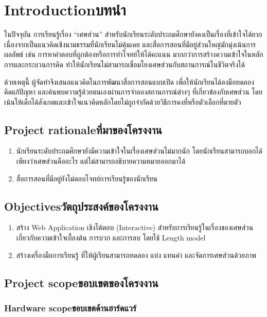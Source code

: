 \chapter{\ifenglish Introduction\else บทนำ\fi}
ในปัจจุบัน การเรียนรู้เรื่อง “เศษส่วน” สำหรับนักเรียนระดับประถมศึกษายังคงเป็นเรื่องที่เข้าใจได้ยาก เนื่องจากเป็นแนวคิดเชิงนามธรรมที่นักเรียนไม่คุ้นเคย และสื่อการสอนที่มีอยู่ส่วนใหญ่มักมุ่งเน้นการผลลัพธ์ เช่น การหาคำตอบที่ถูกต้องหรือการทำโจทย์ให้ได้คะแนน มากกว่าการสร้างความเข้าใจในหลักการและกระบวนการคิด ทำให้นักเรียนไม่สามารถเชื่อมโยงเศษส่วนกับสถานการณ์ในชีวิตจริงได้

ด้วยเหตุนี้ ผู้จัดทำจึงเสนอแนวคิดในการพัฒนาสื่อการสอนแบบเปิด เพื่อให้นักเรียนได้ลงมือทดลอง คิดแก้ปัญหา และค้นพบความรู้ด้วยตนเองผ่านการจำลองสถานการณ์ต่างๆ ที่เกี่ยวข้องกับเศษส่วน โดยเน้นให้เด็กได้สังเกตและเข้าใจแนวคิดหลักโดยไม่ถูกจำกัดด้วยวิธีการคงที่หรือตัวเลือกที่ตายตัว

\section{\ifenglish Project rationale\else ที่มาของโครงงาน\fi}
\begin{enumerate}
    \item นักเรียนระดับประถมศึกษายังมีความเข้าใจในเรื่องเศษส่วนไม่มากนัก โดยนักเรียนสามารถบอกได้เพียงว่าเศษส่วนคืออะไร แต่ไม่สามารถอธิบายความหมายออกมาได้
    \item สื่อการสอนที่มีอยู่ยังไม่ตอบโจทย์การเรียนรู้ของนักเรียน
\end{enumerate}

\section{\ifenglish Objectives\else วัตถุประสงค์ของโครงงาน\fi}
\begin{enumerate}
    \item สร้าง Web Application เชิงโต้ตอบ (Interactive) สำหรับการเรียนรู้ในเรื่องของเศษส่วน เกี่ยวกับความเข้าใจเบื้องต้น การบวก และการลบ โดยใช้ Length model
    \item สร้างเครื่องมือการเรียนรู้ ที่ให้ผู้เรียนสามารถทดลอง แบ่ง แทนค่า และจัดการเศษส่วนด้วยภาพ
\end{enumerate}

\section{\ifenglish Project scope\else ขอบเขตของโครงงาน\fi}

\subsection{\ifenglish Hardware scope\else ขอบเขตด้านฮาร์ดแวร์\fi}

